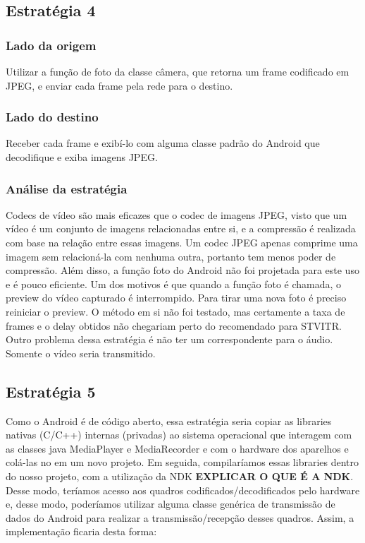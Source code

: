 \documentclass{acm_proc_article-sp}
\newcommand{\todo}[1]{\textcolor[rgb]{1.00,0.00,0.00}{\bf \uppercase{#1}}}
\begin{document}
\subsection{Estratégia 4}

\subsubsection{Lado da origem}

Utilizar a função de foto da classe câmera, que retorna um frame codificado em JPEG, e enviar cada frame pela rede para o destino.

\subsubsection{Lado do destino}

Receber cada frame e exibí-lo com alguma classe padrão do Android que decodifique e exiba imagens JPEG.

\subsubsection{Análise da estratégia}

Codecs de vídeo são mais eficazes que o codec de imagens JPEG, visto que um vídeo é um conjunto de imagens relacionadas entre si, e a compressão é realizada com base na relação entre essas imagens. Um codec JPEG apenas comprime uma imagem sem relacioná-la com nenhuma outra, portanto tem menos poder de compressão. Além disso, a função foto do Android não foi projetada para este uso e é pouco eficiente. Um dos motivos é que quando a função foto é chamada, o preview do vídeo capturado é interrompido. Para tirar uma nova foto é preciso reiniciar o preview. O método em si não foi testado, mas certamente a taxa de frames e o delay obtidos não chegariam perto do recomendado para STVITR. Outro problema dessa estratégia é não ter um correspondente para o áudio. Somente o vídeo seria transmitido.

\subsection{Estratégia 5}
Como o Android é de código aberto, essa estratégia seria copiar as libraries nativas (C/C++) internas (privadas) ao sistema operacional que interagem com as classes java MediaPlayer e MediaRecorder e com o hardware dos aparelhos e colá-las no em um novo projeto. Em seguida, compilaríamos essas libraries dentro do nosso projeto, com a utilização da NDK \todo{explicar o que é a ndk}. Desse modo, teríamos acesso aos quadros codificados/decodificados pelo hardware e, desse modo, poderíamos utilizar alguma classe genérica de transmissão de dados do Android para realizar a transmissão/recepção desses quadros. Assim, a implementação ficaria desta forma:
\end{document}
